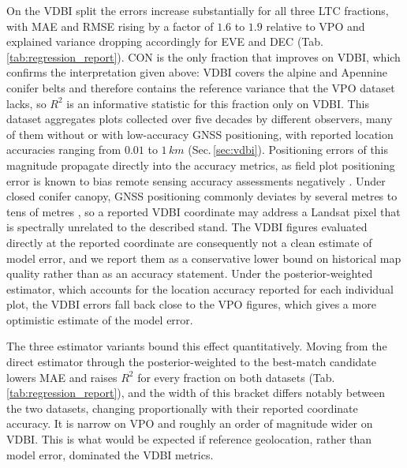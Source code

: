 \documentclass[essd, manuscript]{copernicus}
\begin{document}
On the VDBI split the errors increase substantially for all three LTC fractions, with MAE and RMSE rising by a factor of $1.6$ to $1.9$ relative to VPO and explained variance dropping accordingly for EVE and DEC (Tab.\,\ref{tab:regression_report}). CON is the only fraction that improves on VDBI, which confirms the interpretation given above: VDBI covers the alpine and Apennine conifer belts and therefore contains the reference variance that the VPO dataset lacks, so $R^2$ is an informative statistic for this fraction only on VDBI. This dataset aggregates plots collected over five decades by different observers, many of them without or with low-accuracy GNSS positioning, with reported location accuracies ranging from $0.01$ to $1\,\unit{km}$ (Sec.\,\ref{sec:vdbi}). Positioning errors of this magnitude propagate directly into the accuracy metrics, as field plot positioning error is known to bias remote sensing accuracy assessments negatively \citep{persson_quantify_2022}. Under closed conifer canopy, GNSS positioning commonly deviates by several metres to tens of metres \citep{strunk_examination_2025}, so a reported VDBI coordinate may address a Landsat pixel that is spectrally unrelated to the described stand. The VDBI figures evaluated directly at the reported coordinate are consequently not a clean estimate of model error, and we report them as a conservative lower bound on historical map quality rather than as an accuracy statement. Under the posterior-weighted estimator, which accounts for the location accuracy reported for each individual plot, the VDBI errors fall back close to the VPO figures, which gives a more optimistic estimate of the model error.

The three estimator variants bound this effect quantitatively. Moving from the direct estimator through the posterior-weighted to the best-match candidate lowers MAE and raises $R^2$ for every fraction on both datasets (Tab.\,\ref{tab:regression_report}), and the width of this bracket differs notably between the two datasets, changing proportionally with their reported coordinate accuracy. It is narrow on VPO and roughly an order of magnitude wider on VDBI. This is what would be expected if reference geolocation, rather than model error, dominated the VDBI metrics. %
\end{document}
